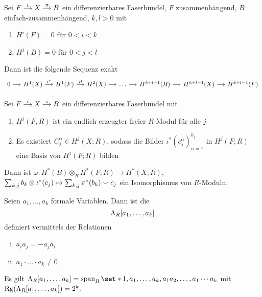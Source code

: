 \begin{satz}[name={Serre-Sequenz, Spanier},label=satz:336]
	Sei \(
		\begin{tikzcd}[cramped,sep=small]
			F \rar["\iota"] & X \rar["\pi"] & B
		\end{tikzcd}
	\) ein differenzierbares Faserbündel, $F$ zusammenhängend, $B$ einfach-zusammenhängend, $k, l > 0$ mit
	\begin{enumerate}[1)]
		\item $H^i(F)=0$ für $0 < i < k$
		\item $H^j(B)=0$ für $0 < j< l$
	\end{enumerate}
	Dann ist die folgende Sequenz exakt
	\[
		\begin{tikzcd}[sep=small]
			0 \rar & H^1(X) \rar["\iota^*"] & H^1(F) \rar["\partial"] & H^2(X) \rar & \ldots \rar & H^{k+l-1}(B) \rar & H^{k+l-1}(X) \rar & H^{k+l-1} (F)
 		\end{tikzcd}
	\]
\end{satz}
\begin{satz}[name={Leray-Hirsch},label=satz:337]
	Sei \(
		\begin{tikzcd}[cramped,sep=small]
			F \rar["i"] & X \rar["\pi"] & B
		\end{tikzcd}
	\) ein differenzierbares Faserbündel mit
	\begin{enumerate}[1)]
		\item $H^j(F,R)$ ist ein endlich erzeugter freier $R$-Modul für alle $j$
		\item Es existiert $C_j^\alpha \in H^j(X;R)$, sodass die Bilder $\iota^*(c^\alpha_j)^{k_j}_{\alpha=1}$ in $H^j(F;R)$ eine Basis von $H^j(F;R)$ bilden
	\end{enumerate}
	Dann ist $\varphi \colon H^*(B) \otimes_R H^*(F;R) \to H^*(X;R)$, $\sum_{k,j} b_k \otimes \iota^*(c_j) \mapsto \sum_{k,j} \pi^*(b_k) \smallsmile c_j$ ein Isomorphismus von $R$-Moduln.
\end{satz}

\begin{definition}[{name=[äußere Algebra]}]
	Seien $a_1, \ldots ,a_k$ formale Variablen.
	Dann ist die  
	\[
		\Lambda_R \benbrace*{a_1, \ldots ,a_k}
	\]
	definiert vermittels der Relationen 
	\begin{enumerate}[(i)]
		\item $a_i a_j = - a_j a_i$
		\item $a_1 \cdot \ldots \cdot a_k \neq 0$
	\end{enumerate}
	Es gilt $\Lambda_R \benbrace*{a_1, \ldots ,a_k} = \Span_R \set*{1, a_1, \ldots ,a_k, a_1 a_2, \ldots , a_1 \cdots a_k}$ mit $\Rg \enbrace*{\Lambda_R \benbrace*{a_1, \ldots ,a_k}} = 2^k$.
\end{definition}

